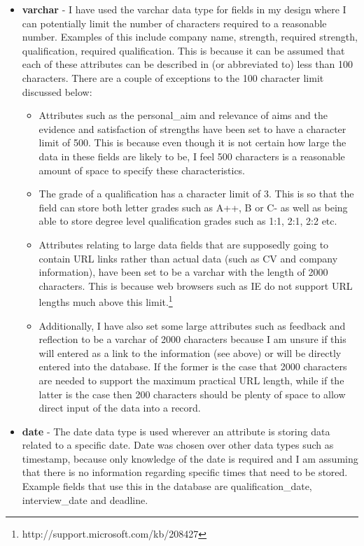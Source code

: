 \documentclass{article}
\begin{document}
\begin{itemize}
\item \textbf{varchar} - I have used the varchar data type for fields in my design where I can potentially limit the number of characters required to a reasonable number. Examples of this include company name, strength, required strength, qualification, required qualification. This is because it can be assumed that each of these attributes can be described in (or abbreviated to) less than 100 characters. There are a couple of exceptions to the 100 character limit discussed below:

\begin{itemize}
\item Attributes such as the personal\_aim and relevance of aims and the evidence and satisfaction of strengths have been set to have a character limit of 500. This is because even though it is not certain how large the data in these fields are likely to be, I feel 500 characters is a reasonable amount of space to specify these characteristics.

\item The grade of a qualification has a character limit of 3. This is so that the field can store both letter grades such as A++, B or C- as well as being able to store degree level qualification grades such as 1:1, 2:1, 2:2 etc. 

\item Attributes relating to large data fields that are supposedly going to contain URL links rather than actual data (such as CV and company information), have been set to be a varchar with the length of 2000 characters. This is because web browsers such as IE do not support URL lengths much above this limit.\footnote{http://support.microsoft.com/kb/208427}

\item Additionally, I have also set some large attributes such as feedback and reflection to be a varchar of 2000 characters because I am unsure if this will entered as a link to the information (see above) or will be directly entered into the database. If the former is the case that 2000 characters are needed to support the maximum practical URL length, while if the latter is the case then 200 characters should be plenty of space to allow direct input of the data into a record.

\end{itemize}

\item \textbf{date} - The date data type is used wherever an attribute is storing data related to a specific date. Date was chosen over other data types such as timestamp, because only knowledge of the date is required and I am assuming that there is no information regarding specific times that need to be stored. Example fields that use this in the database are qualification\_date, interview\_date and deadline.


\end{itemize}
\end{document}
